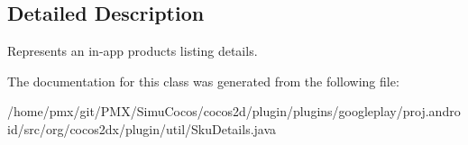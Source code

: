 \subsection{Detailed Description}
Represents an in-\/app product\textquotesingle{}s listing details. 

The documentation for this class was generated from the following file\+:\begin{DoxyCompactItemize}
\item 
/home/pmx/git/\+P\+M\+X/\+Simu\+Cocos/cocos2d/plugin/plugins/googleplay/proj.\+android/src/org/cocos2dx/plugin/util/Sku\+Details.\+java\end{DoxyCompactItemize}
